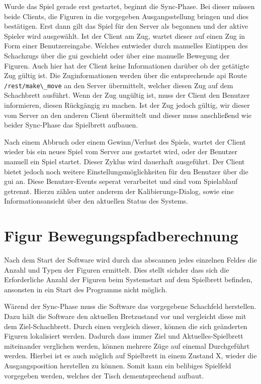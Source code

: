 Wurde das Spiel gerade erst gestartet, beginnt die Sync-Phase. Bei
dieser müssen beide Clients, die Figuren in die vorgegeben
Ausgangsstellung bringen und dies bestätigen. Erst dann gilt das Spiel
für den Server als begonnen und der aktive Spieler wird ausgewählt. Ist
der Client am Zug, wartet dieser auf einen Zug in Form einer
Benutzereingabe. Welches entwieder durch manuelles Eintippen des
Schachzugs über die \gls{gui} geschieht oder über eine manuelle Bewegung
der Figuren. Auch hier hat der Client keine Informationen darüber ob der
getätigte Zug gültig ist. Die Zuginformationen werden über die
entsprechende \gls{api} Route \passthrough{\lstinline!/rest/make\_move!}
an den Server übermittelt, welcher diesen Zug auf dem Schachbrett
ausführt. Wenn der Zug ungültig ist, muss der Client den Benutzer
informieren, diesen Rückgängig zu machen. Ist der Zug jedoch gültig, wir
dieser vom Server an den anderen Client übermittelt und dieser muss
anschließend wie beider Sync-Phase das Spielbrett aufbauen.

Nach einem Abbruch oder einem Gewinn/Verlust des Spiels, wartet der
Client wieder bis ein neues Spiel vom Server aus gestartet wird, oder
der Benutzer manuell ein Spiel startet. Dieser Zyklus wird dauerhaft
ausgeführt. Der Client bietet jedoch noch weitere
Einstellungsmöglichkeiten für den Benutzer über die \gls{gui} an. Diese
Benutzer-Events seperat verarbeitet und sind vom Spielablauf getrennt.
Hierzu zählen unter anderem der Kalibierungs-Dialog, sowie eine
Informationsansicht über den aktuellen Status des Systems.

\hypertarget{figur-bewegungspfadberechnung}{%
\section{Figur
Bewegungspfadberechnung}\label{figur-bewegungspfadberechnung}}

Nach dem Start der Software wird durch das abscannen jedes einzelnen
Feldes die Anzahl und Typen der Figuren ermittelt. Dies stellt sichder
dass sich die Erforderliche Anzahl der Figuren beim Systemstart auf dem
Spielbrett befinden, ansonsten in ein Start des Programms nicht möglich.

Wärend der Sync-Phase muss die Software das vorgegebene Schachfeld
herstellen. Dazu hält die Software den aktuellen Bretzustand vor und
vergleicht diese mit dem Ziel-Schachbrett. Durch einen vergleich dieser,
können die sich geänderten Figuren lokalisiert werden. Dadurch dass
immer Ziel und Aktuelles-Spielbrett miteinander verglichen werden,
können mehrere Züge auf einemal Durchgeführt werden. Hierbei ist es auch
möglich auf Spielbrett in einem Zustand X, wieder die Ausgangsposition
herstellen zu können. Somit kann ein belibiges Spielfeld vorgegeben
werden, welches der Tisch dementsprechend aufbaut.

